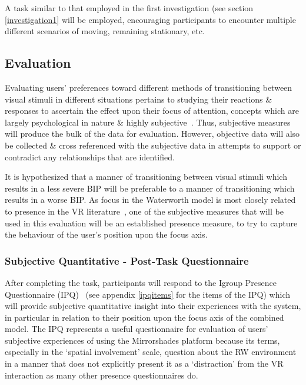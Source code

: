 A task similar to that employed in the first investigation (see section \ref{investigation1} will be employed, encouraging participants to encounter multiple different scenarios of moving, remaining stationary, etc.

\subsection{Evaluation}


Evaluating users' preferences toward different methods of transitioning between visual stimuli in different situations pertains to studying their reactions \& responses to ascertain the effect upon their focus of attention, concepts which are largely psychological in nature \& highly subjective~\cite{Ijsselsteijn2001}. Thus, subjective measures will produce the bulk of the data for evaluation. However, objective data will also be collected \& cross referenced with the subjective data in attempts to support or contradict any relationships that are identified.

It is hypothesized that a manner of transitioning between visual stimuli which results in a less severe BIP will be preferable to a manner of transitioning which results in a worse BIP. As focus in the Waterworth model is most closely related to presence in the VR literature~\cite{Waterworth2001}, one of the subjective measures that will be used in this evaluation will be an established presence measure, to try to capture the behaviour of the user's position upon the focus axis.

\subsubsection{Subjective Quantitative - Post-Task Questionnaire}
After completing the task, participants will respond to the Igroup Presence Questionnaire (IPQ)~\cite{Schubert2001} (see appendix \ref{ipqitems} for the items of the IPQ) which will provide subjective quantitative insight into their experiences with the system, in particular in relation to their position upon the focus axis of the combined model. The IPQ represents a useful questionnaire for evaluation of users' subjective experiences of using the Mirrorshades platform because its terms, especially in the `spatial involvement' scale, question about the RW environment in a manner that does not explicitly present it as a `distraction' from the VR interaction as many other presence questionnaires do.

